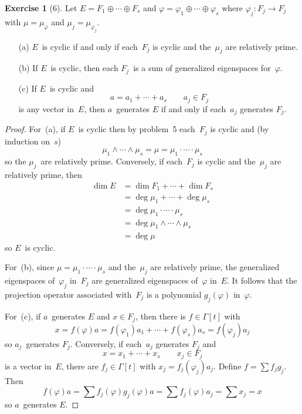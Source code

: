 \documentclass[letterpaper,12pt]{article}
\newcommand{\meet}{\wedge}
\newcommand{\dsum}{\oplus}
\newcommand{\mult}{\cdot}
\theoremstyle{definition}
\newtheorem*{exer}{Exercise}
\theoremstyle{remark}
\begin{document}
\begin{exer}[6]
Let \(E=F_1\dsum\cdots\dsum F_s\) and \(\varphi=\varphi_1\dsum\cdots\dsum\varphi_s\) where \(\varphi_j:F_j\to F_j\) with \(\mu=\mu_{\varphi}\) and \(\mu_j=\mu_{\varphi_j}\).
\begin{enumerate}
\item[(a)] \(E\)~is cyclic if and only if each~\(F_j\) is cyclic and the~\(\mu_j\) are relatively prime.
\item[(b)] If \(E\)~is cyclic, then each \(F_j\)~is a sum of generalized eigenspaces for~\(\varphi\).
\item[(c)] If \(E\)~is cyclic and
\[a=a_1+\cdots+a_s\qquad a_j\in F_j\]
is any vector in~\(E\), then \(a\)~generates \(E\) if and only if each~\(a_j\) generates \(F_j\).
\end{enumerate}
\end{exer}
\begin{proof}
For~(a), if \(E\)~is cyclic then by problem~5 each~\(F_j\) is cyclic and (by induction on~\(s\))
\[\mu_1\meet\cdots\meet\mu_s=\mu=\mu_1\mult\cdots\mult\mu_s\]
so the \(\mu_j\)~are relatively prime. Conversely, if each~\(F_j\) is cyclic and the~\(\mu_j\) are relatively prime, then
\begin{align*}
\dim E&=\dim F_1+\cdots+\dim F_s\\
	&=\deg\mu_1+\cdots+\deg\mu_s\\
	&=\deg\mu_1\mult\cdots\mult\mu_s\\
	&=\deg\mu_1\meet\cdots\meet\mu_s\\
	&=\deg\mu
\end{align*}
so \(E\)~is cyclic.

For~(b), since \(\mu=\mu_1\mult\cdots\mult\mu_s\) and the~\(\mu_j\) are relatively prime, the generalized eigenspaces of~\(\varphi_j\) in~\(F_j\) are generalized eigenspaces of~\(\varphi\) in~\(E\). It follows that the projection operator associated with~\(F_j\) is a polynomial \(g_j(\varphi)\) in~\(\varphi\).

For~(c), if \(a\)~generates \(E\) and \(x\in F_j\), then there is \(f\in\Gamma[t]\) with
\[x=f(\varphi)a=f(\varphi_1)a_1+\cdots+f(\varphi_s)a_s=f(\varphi_j)a_j\]
so \(a_j\)~generates \(F_j\). Conversely, if each~\(a_j\) generates \(F_j\) and
\[x=x_1+\cdots+x_s\qquad x_j\in F_j\]
is a vector in~\(E\), there are \(f_j\in\Gamma[t]\) with \(x_j=f_j(\varphi_j)a_j\). Define \(f=\sum f_jg_j\). Then
\[f(\varphi)a=\sum f_j(\varphi)g_j(\varphi)a=\sum f_j(\varphi)a_j=\sum x_j=x\]
so \(a\)~generates \(E\).
\end{proof}
\end{document}
